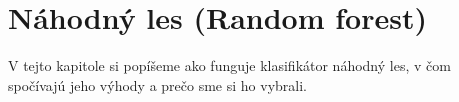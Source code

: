 \chapter{Náhodný les (Random forest)}

V tejto kapitole si popíšeme ako funguje klasifikátor náhodný les, v čom spočívajú jeho výhody a prečo sme si ho vybrali.